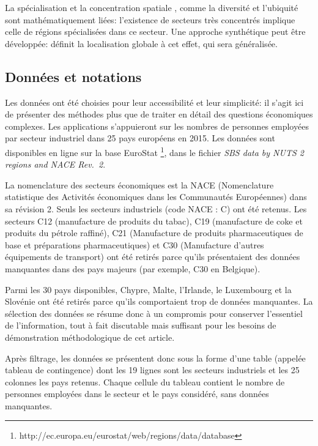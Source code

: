 \documentclass[fleqn,10pt]{ArtEcoFoG} %
\begin{document}
La spécialisation et la concentration spatiale \citep{Cutrini2010},
comme la diversité et l'ubiquité \citep{Gregorius2010} sont
mathématiquement liées: l'existence de secteurs très concentrés implique
celle de régions spécialisées dans ce secteur. Une approche synthétique
peut être développée: \citet{Cutrini2010} définit la \og localisation
globale\fg{} à cet effet, qui sera généralisée.

\subsection{Données et notations}\label{donnees-et-notations}

Les données ont été choisies pour leur accessibilité et leur simplicité:
il s'agit ici de présenter des méthodes plus que de traiter en détail
des questions économiques complexes. Les applications s'appuieront sur
les nombres de personnes employées par secteur industriel dans 25 pays
européens en 2015. Les données sont disponibles en ligne sur la base
EuroStat \footnote{http://ec.europa.eu/eurostat/web/regions/data/database},
dans le fichier \emph{SBS data by NUTS 2 regions and NACE Rev.~2}.

La nomenclature des secteurs économiques est la NACE (Nomenclature
statistique des Activités économiques dans les Communautés Européennes)
dans sa révision 2. Seuls les secteurs industriels (code NACE : C) ont
été retenus. Les secteurs C12 (manufacture de produits du tabac), C19
(manufacture de coke et produits du pétrole raffiné), C21 (Manufacture
de produits pharmaceutiques de base et préparations pharmaceutiques) et
C30 (Manufacture d'autres équipements de transport) ont été retirés
parce qu'ils présentaient des données manquantes dans des pays majeurs
(par exemple, C30 en Belgique).

Parmi les 30 pays disponibles, Chypre, Malte, l'Irlande, le Luxembourg
et la Slovénie ont été retirés parce qu'ils comportaient trop de données
manquantes. La sélection des données se résume donc à un compromis pour
conserver l'essentiel de l'information, tout à fait discutable mais
suffisant pour les besoins de démonstration méthodologique de cet
article.

Après filtrage, les données se présentent donc sous la forme d'une table
(appelée tableau de contingence) dont les 19 lignes sont les secteurs
industriels et les 25 colonnes les pays retenus. Chaque cellule du
tableau contient le nombre de personnes employées dans le secteur et le
pays considéré, sans données manquantes.
\end{document}
